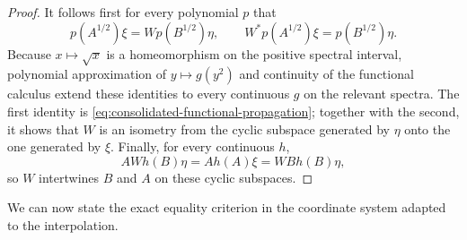 \documentclass[11pt]{article}
\theoremstyle{remark}
\newcommand{\1}{\mathbbm{1}}
\begin{document}
\begin{proof}
It follows first for every polynomial $p$ that
\begin{equation}
 p(A^{1/2})\xi=Wp(B^{1/2})\eta,
 \qquad
 W^*p(A^{1/2})\xi=p(B^{1/2})\eta.
\end{equation}
Because $x\mapsto\sqrt{x}$ is a homeomorphism on the positive
spectral interval, polynomial approximation of
$y\mapsto g(y^2)$ and continuity of the functional calculus extend
these identities to every continuous $g$ on the relevant spectra.
The first identity is
\eqref{eq:consolidated-functional-propagation}; together with the
second, it shows that $W$ is an isometry from the cyclic subspace
generated by $\eta$ onto the one generated by $\xi$.  Finally, for
every continuous $h$,
\begin{equation}
 AW h(B)\eta
 =A h(A)\xi
 =W B h(B)\eta,
\end{equation}
so $W$ intertwines $B$ and $A$ on these cyclic subspaces.
\end{proof}

We can now state the exact equality criterion in the coordinate system
adapted to the interpolation.
\end{document}
